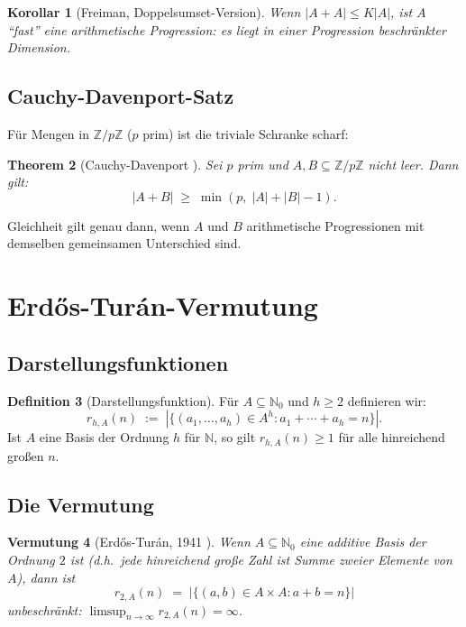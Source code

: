 \documentclass[12pt,a4paper]{amsart}
\newtheorem{theorem}{Theorem}[section]
\newtheorem{korollar}[theorem]{Korollar}
\newtheorem{vermutung}[theorem]{Vermutung}
\theoremstyle{definition}
\newtheorem{definition}[theorem]{Definition}
\newcommand{\N}{\mathbb{N}}
\newcommand{\Z}{\mathbb{Z}}
\newcommand{\abs}[1]{\left|#1\right|}
\begin{document}
\begin{korollar}[Freiman, Doppelsumset-Version]
Wenn $\abs{A + A} \leq K\abs{A}$, ist $A$ ``fast'' eine arithmetische
Progression: es liegt in einer Progression beschr\"{a}nkter Dimension.
\end{korollar}

\subsection{Cauchy-Davenport-Satz}

F\"{u}r Mengen in $\Z/p\Z$ ($p$ prim) ist die triviale Schranke scharf:

\begin{theorem}[Cauchy-Davenport \cite{Cauchy1813}]
Sei $p$ prim und $A, B \subseteq \Z/p\Z$ nicht leer.  Dann gilt:
\[
  \abs{A + B} \;\geq\; \min(p,\; \abs{A} + \abs{B} - 1).
\]
\end{theorem}

Gleichheit gilt genau dann, wenn $A$ und $B$ arithmetische
Progressionen mit demselben gemeinsamen Unterschied sind.

\section{Erd\H{o}s-Tur\'{a}n-Vermutung}\label{sec:erdos-turan}

\subsection{Darstellungsfunktionen}

\begin{definition}[Darstellungsfunktion]
F\"{u}r $A \subseteq \N_0$ und $h \geq 2$ definieren wir:
\[
  r_{h,A}(n) \;:=\; \abs{\{(a_1, \ldots, a_h) \in A^h :
                          a_1 + \cdots + a_h = n\}}.
\]
Ist $A$ eine Basis der Ordnung $h$ f\"{u}r $\N$, so gilt
$r_{h,A}(n) \geq 1$ f\"{u}r alle hinreichend gro\ss{}en $n$.
\end{definition}

\subsection{Die Vermutung}

\begin{vermutung}[Erd\H{o}s-Tur\'{a}n, 1941 \cite{ErdosTuran1941}]
\label{verm:erdos-turan}
Wenn $A \subseteq \N_0$ eine additive Basis der Ordnung $2$ ist (d.h.\
jede hinreichend gro\ss{}e Zahl ist Summe zweier Elemente von $A$),
dann ist
\[
  r_{2,A}(n) \;=\; \abs{\{(a, b) \in A \times A : a + b = n\}}
\]
unbeschr\"{a}nkt: $\limsup_{n \to \infty} r_{2,A}(n) = \infty$.
\end{vermutung}
\end{document}

